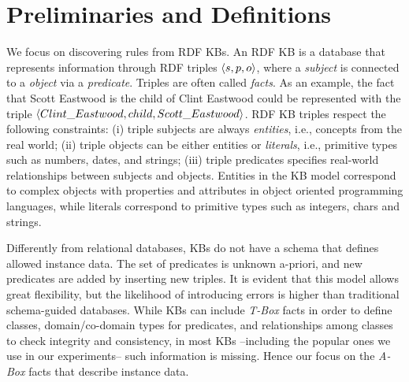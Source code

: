 \section{Preliminaries and Definitions} \label{sec:krd_prel}
We focus on discovering rules from RDF KBs. An RDF KB is
a database that represents information through RDF triples $\langle s,p,o\rangle$, where a \emph{subject} is connected to a \emph{object} via a \emph{predicate}. Triples are often called \emph{facts}. As an example, the fact that Scott Eastwood is the child of Clint Eastwood could be represented with the triple $\langle Clint\_Eastwood,child,Scott\_Eastwood\rangle$. 
RDF KB triples respect the following constraints:
(i) triple subjects are always \emph{entities}, i.e., concepts from the real world;
(ii) triple objects can be either entities or \emph{literals}, i.e.,  primitive types such as numbers, dates, and strings;
(iii) triple predicates specifies real-world relationships between subjects and objects.
Entities in the KB model correspond to complex objects with properties and attributes in object oriented programming languages, while literals correspond to primitive types such as integers, chars and strings.

Differently from relational databases, KBs do not have a schema that defines allowed instance data. 
The set of predicates is unknown a-priori, and new predicates are added by inserting new triples. %
It is evident that this model allows great flexibility, but the likelihood of introducing errors is higher than traditional schema-guided databases.
While KBs can include \emph{T-Box} facts in order to define classes, domain/co-domain types for predicates, and relationships among classes
to check integrity and consistency, in most KBs --including the popular ones we use in our experiments-- such information is missing. %
Hence our focus on the \emph{A-Box} facts that describe instance data. 

